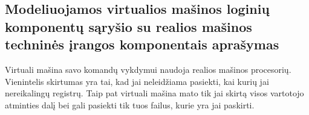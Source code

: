 \subsection{Modeliuojamos virtualios mašinos loginių komponentų sąryšio su 
realios mašinos techninės įrangos komponentais aprašymas}

Virtuali mašina savo komandų vykdymui naudoja realios mašinos procesorių.
Vienintelis skirtumas yra tai, kad jai neleidžiama pasiekti, kai kurių
jai nereikalingų registrų. Taip pat virtuali mašina mato tik jai skirtą
visos vartotojo atminties dalį bei gali pasiekti tik tuos failus, kurie
yra jai paskirti.
   

